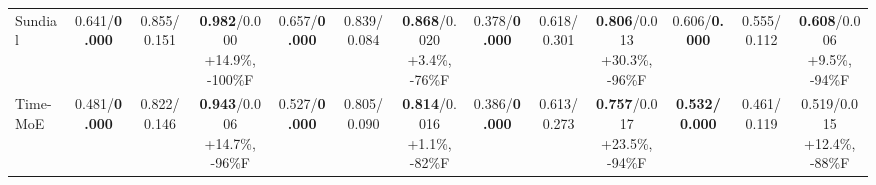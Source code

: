 \begin{table}[t]
{\begin{tabular}{lcccccccccccc}
Sundial & 0.641/\textbf{0.000} & 0.855/0.151 & \makecell{\textbf{0.982}/0.000\\{\scriptsize +14.9\%, -100\%F}} & 0.657/\textbf{0.000} & 0.839/0.084 & \makecell{\textbf{0.868}/0.020\\{\scriptsize +3.4\%, -76\%F}} & 0.378/\textbf{0.000} & 0.618/0.301 & \makecell{\textbf{0.806}/0.013\\{\scriptsize +30.3\%, -96\%F}} & 0.606/\textbf{0.000} & 0.555/0.112 & \makecell{\textbf{0.608}/0.006\\{\scriptsize +9.5\%, -94\%F}} \\
Time-MoE & 0.481/\textbf{0.000} & 0.822/0.146 & \makecell{\textbf{0.943}/0.006\\{\scriptsize +14.7\%, -96\%F}} & 0.527/\textbf{0.000} & 0.805/0.090 & \makecell{\textbf{0.814}/0.016\\{\scriptsize +1.1\%, -82\%F}} & 0.386/\textbf{0.000} & 0.613/0.273 & \makecell{\textbf{0.757}/0.017\\{\scriptsize +23.5\%, -94\%F}} & \textbf{0.532/0.000} & 0.461/0.119 & \makecell{0.519/0.015\\{\scriptsize +12.4\%, -88\%F}} \\
\bottomrule
\end{tabular}}
\end{table}
